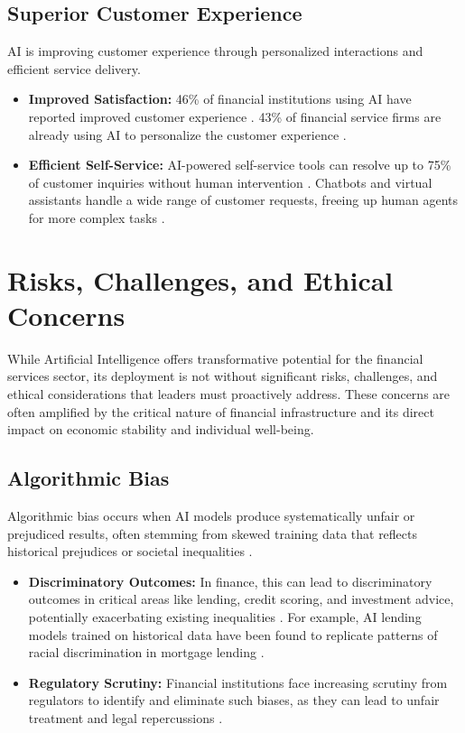 \subsection{Superior Customer Experience}
AI is improving customer experience through personalized interactions and efficient service delivery.
\begin{itemize}
    \item \textbf{Improved Satisfaction:} 46\% of financial institutions using AI have reported improved customer experience \cite{MasterOfCode_AI_Finance}. 43\% of financial service firms are already using AI to personalize the customer experience \cite{BizTechMagazine_AI_Finance}.
    \item \textbf{Efficient Self-Service:} AI-powered self-service tools can resolve up to 75\% of customer inquiries without human intervention \cite{MasterOfCode_AI_Finance}. Chatbots and virtual assistants handle a wide range of customer requests, freeing up human agents for more complex tasks \cite{RTSLabs_AI_Finance}.
\end{itemize}

\section{Risks, Challenges, and Ethical Concerns}

While Artificial Intelligence offers transformative potential for the financial services sector, its deployment is not without significant risks, challenges, and ethical considerations that leaders must proactively address. These concerns are often amplified by the critical nature of financial infrastructure and its direct impact on economic stability and individual well-being.

\subsection{Algorithmic Bias}
Algorithmic bias occurs when AI models produce systematically unfair or prejudiced results, often stemming from skewed training data that reflects historical prejudices or societal inequalities \cite{TrueRev_AlgorithmicBias, JournalWJARR_AlgorithmicBias}.
\begin{itemize}
    \item \textbf{Discriminatory Outcomes:} In finance, this can lead to discriminatory outcomes in critical areas like lending, credit scoring, and investment advice, potentially exacerbating existing inequalities \cite{Randstad_AlgorithmicBias, Netguru_AlgorithmicBias}. For example, AI lending models trained on historical data have been found to replicate patterns of racial discrimination in mortgage lending \cite{UNTDallas_AlgorithmicBias}.
    \item \textbf{Regulatory Scrutiny:} Financial institutions face increasing scrutiny from regulators to identify and eliminate such biases, as they can lead to unfair treatment and legal repercussions \cite{EY_AlgorithmicBias}.
\end{itemize}

